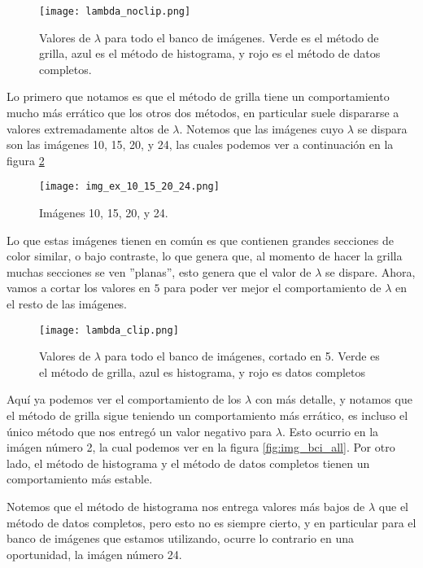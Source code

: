     \begin{figure}[H]
        \centering
        \texttt{[image: lambda\_noclip.png]}
        \caption{Valores de $\lambda$ para todo el banco de im\'agenes. Verde es el m\'etodo de grilla, azul es el m\'etodo de histograma, y rojo es el m\'etodo de datos completos.}
        \label{fig:lambda_noclip}
    \end{figure}

    Lo primero que notamos es que el m\'etodo de grilla tiene un comportamiento mucho m\'as err\'atico que los otros dos m\'etodos, en particular suele dispararse a valores extremadamente altos de $\lambda$. Notemos que las im\'agenes cuyo $\lambda$ se dispara son las im\'agenes 10, 15, 20, y 24, las cuales podemos ver a continuaci\'on en la figura \ref{fig:img_bci_10_15_20}

    \begin{figure}[H]
        \centering
        \texttt{[image: img\_ex\_10\_15\_20\_24.png]}
        \caption{Im\'agenes 10, 15, 20, y 24.}
        \label{fig:img_bci_10_15_20}
    \end{figure}

    Lo que estas im\'agenes tienen en com\'un es que contienen grandes secciones de color similar, o bajo contraste, lo que genera que, al momento de hacer la grilla muchas secciones se ven ''planas'', esto genera que el valor de $\lambda$ se dispare. Ahora, vamos a cortar los valores en $5$ para poder ver mejor el comportamiento de $\lambda$ en el resto de las im\'agenes.

    \begin{figure}[H]
        \centering
        \texttt{[image: lambda\_clip.png]}
        \caption{Valores de $\lambda$ para todo el banco de im\'agenes, cortado en 5. Verde es el m\'etodo de grilla, azul es histograma, y rojo es datos completos}
        \label{fig:lambda_clip}
    \end{figure}

    Aqu\'i ya podemos ver el comportamiento de los $\lambda$ con m\'as detalle, y notamos que el m\'etodo de grilla sigue teniendo un comportamiento m\'as err\'atico, es incluso el \'unico m\'etodo que nos entreg\'o un valor negativo para $\lambda$. Esto ocurrio en la im\'agen n\'umero 2, la cual podemos ver en la figura \ref{fig:img_bci_all}. Por otro lado, el m\'etodo de histograma y el m\'etodo de datos completos tienen un comportamiento m\'as estable. 
    
    Notemos que el m\'etodo de histograma nos entrega valores m\'as bajos de $\lambda$ que el m\'etodo de datos completos, pero esto no es siempre cierto, y en particular para el banco de im\'agenes que estamos utilizando, ocurre lo contrario en una oportunidad, la im\'agen n\'umero 24.

